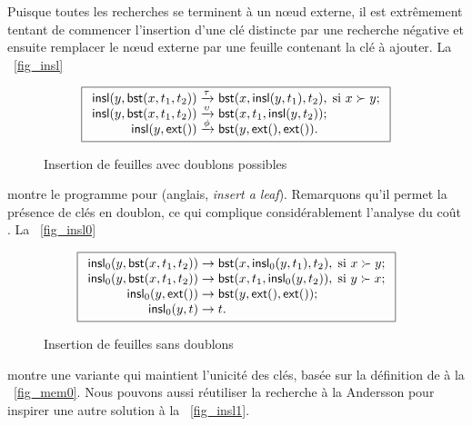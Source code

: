 Puisque toutes les recherches se terminent à un n{\oe}ud externe, il
est extrêmement tentant de commencer l'insertion d'une clé distincte
par une recherche négative et ensuite remplacer le n{\oe}ud externe
par une feuille contenant la clé à ajouter. La \fig~\vref{fig_insl}
\begin{figure}[b]
\begin{equation*}
\boxed{
\begin{array}{r@{\;}l@{\;}l}
\fun{insl}(y,\fun{bst}(x,t_1,t_2)) & \xrightarrow{\smash{\tau}} &
  \fun{bst}(x,\fun{insl}(y,t_1),t_2), \; \text{si \(x \succ y\)};\\
\fun{insl}(y,\fun{bst}(x,t_1,t_2)) & \xrightarrow{\smash{\upsilon}} &
  \fun{bst}(x,t_1,\fun{insl}(y,t_2));\\
\fun{insl}(y,\fun{ext}()) & \xrightarrow{\smash{\phi}} & \fun{bst}(y,\fun{ext}(),\fun{ext}()).
\end{array}}
\end{equation*}
\caption{Insertion de feuilles avec doublons possibles\label{fig_insl}}
\end{figure}
montre le programme pour 
(anglais, \emph{insert a leaf}). Remarquons qu'il permet la présence
de clés en doublon, ce qui complique considérablement l'analyse du
coût \citep{Burge_1976,ArchibaldClement_2006,Pasanen_2010}.  La
\fig~\vref{fig_insl0}
\begin{figure}
\begin{equation*}
\boxed{
\begin{array}{r@{\;}l@{\;}l}
\fun{insl}_0(y,\fun{bst}(x,t_1,t_2)) & \rightarrow &
  \fun{bst}(x,\fun{insl}_0(y,t_1),t_2), \; \text{si \(x \succ y\)};\\
\fun{insl}_0(y,\fun{bst}(x,t_1,t_2)) & \rightarrow &
  \fun{bst}(x,t_1,\fun{insl}_0(y,t_2)) , \; \text{si \(y \succ x\)};\\
\fun{insl}_0(y,\fun{ext}()) & \rightarrow &
\fun{bst}(y,\fun{ext}(),\fun{ext}());\\
\fun{insl}_0(y,t) & \rightarrow & t.
\end{array}}
\end{equation*}
\caption{Insertion de feuilles sans doublons\label{fig_insl0}}
\end{figure}
montre une variante qui maintient l'unicité des clés, basée sur la
définition de  à la
\fig~\vref{fig_mem0}. Nous pouvons aussi réutiliser la recherche à la
Andersson pour inspirer une autre solution à la
\fig~\vref{fig_insl1}.
